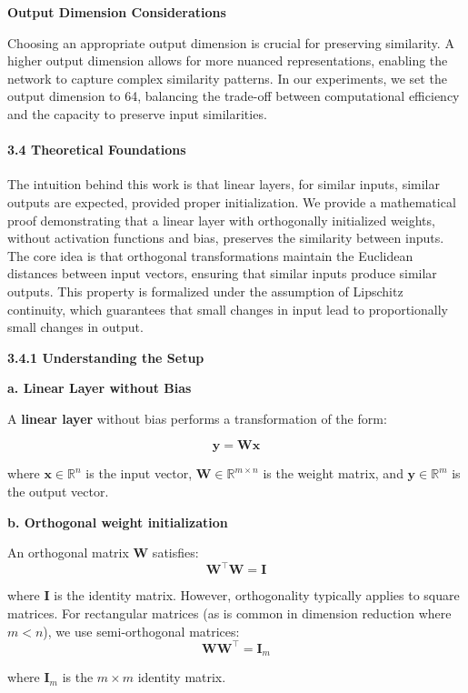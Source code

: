 \documentclass{article}
\begin{document}
\textbf{Output Dimension Considerations}

Choosing an appropriate output dimension is crucial for preserving similarity. A higher output dimension allows for more nuanced representations, enabling the network to capture complex similarity patterns. In our experiments, we set the output dimension to 64, balancing the trade-off between computational efficiency and the capacity to preserve input similarities.

\paragraph{\textbf{3.4 Theoretical Foundations}}

The intuition behind this work is that linear layers, for similar inputs, similar outputs are expected, provided proper initialization. We provide a mathematical proof demonstrating that a linear layer with orthogonally initialized weights, without activation functions and bias, preserves the similarity between inputs. The core idea is that orthogonal transformations maintain the Euclidean distances between input vectors, ensuring that similar inputs produce similar outputs. This property is formalized under the assumption of Lipschitz continuity, which guarantees that small changes in input lead to proportionally small changes in output.



\textbf{3.4.1 Understanding the Setup}


\textbf{a. Linear Layer without Bias}

A \textbf{linear layer} without bias performs a transformation of the form:

\[
\mathbf{y} = \mathbf{W} \mathbf{x}
\]

where \( \mathbf{x} \in \mathbb{R}^n \) is the input vector, \( \mathbf{W} \in \mathbb{R}^{m \times n} \) is the weight matrix, and \( \mathbf{y} \in \mathbb{R}^m \) is the output vector.

\textbf{b. Orthogonal weight initialization}

An orthogonal matrix \( \mathbf{W} \) satisfies:
\[
\mathbf{W}^\top \mathbf{W} = \mathbf{I}
\]

where \( \mathbf{I} \) is the identity matrix. However, orthogonality typically applies to square matrices. For rectangular matrices (as is common in dimension reduction where \( m < n \)), we use semi-orthogonal matrices:
\[
\mathbf{W} \mathbf{W}^\top = \mathbf{I}_m
\]

where \( \mathbf{I}_m \) is the \( m \times m \) identity matrix.
\end{document}
